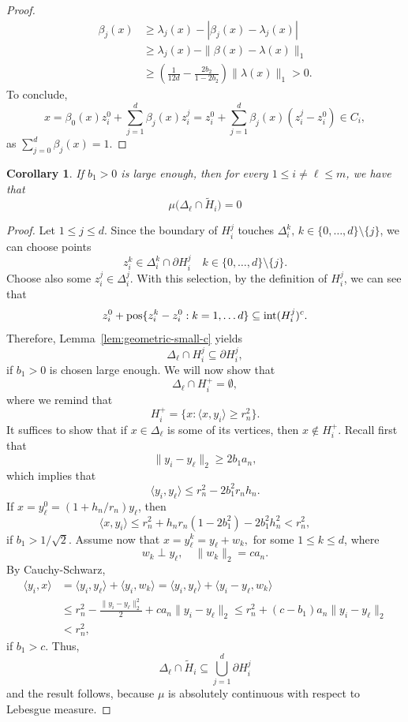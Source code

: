 \documentclass[10pt]{amsart}
\newcommand{\1}{\textbf{1}}
\newcommand{\pos}{{\rm pos}}
\numberwithin{equation}{section} %
\newtheorem{corollary}[theorem]{Corollary}
\theoremstyle{remark}
\theoremstyle{definition}
\begin{document}
\begin{proof}
\begin{align*}
    \beta_j(x)&\geq \lambda_j(x) -|\beta_j(x)-\lambda_j(x)| \\
    &\geq \lambda_j(x)-\|\beta(x)-\lambda(x)\|_1\\
    &\geq \left(\frac{1}{12d}-\frac{2b_2}{1-2b_2}\right)\| \lambda(x)\|_1>0.  
\end{align*}
To conclude, \[x=\beta_0(x)z_i^0+\sum_{j=1}^d \beta_j(x)z_i^j=z_i^0+\sum_{j=1}^d\beta_j(x)(z_i^j-z_i^0) \in C_i,\] as $\sum_{j=0}^d\beta_j(x)=1$.
\end{proof}

\begin{corollary}\label{cor:independence-under-condition}
    If $b_1>0$ is large enough, then for every $1 \leq i \neq \ell \leq m$, we have that \[\mu\bigl(\Delta_\ell \cap \widetilde{H}_i\bigr)=0\]
\end{corollary}

\begin{proof}
    Let $1 \leq j \leq d$. Since the boundary of $H_i^j$ touches $\Delta_i^k, \, k \in \{0,\ldots,d\} \setminus\{j\}$, we can choose points \[z_i^k \in \Delta_i^k \cap \partial H_i^j \quad k \in \{0,\ldots,d\}\setminus\{j\}.\] Choose also some $z_i^j \in \Delta_i^j$. With this selection, by the definition of $H_i^j$, we can see that \[z_i^0+\pos\{z_i^k-z_i^0:k=1,\ldots d\} \subseteq {\rm int}(H_i^j)^{c}.\] Therefore, Lemma~\ref{lem:geometric-small-c} yields \[\Delta_\ell \cap H_i^j \subseteq \partial H_i^j,\] if $b_1>0$ is chosen large enough. We will now show that \[\Delta_\ell \cap H_i^+=\emptyset,\] where we remind that \[H_i^+=\{x: \langle x,y_i \rangle \geq r_n^2\}.\] It suffices to show that if $x \in \Delta_\ell$ is some of its vertices, then $x \notin H_i^+$. Recall first that \[\|y_i-y_\ell\|_2 \geq 2b_1a_n,\] which implies that \[\langle y_i,y_\ell \rangle \leq r_n^2-2b_1^2r_nh_n. \] If $x=y_{\ell}^0=(1+h_n/r_n)y_\ell$, then \[\langle x,y_i\rangle \leq r_n^2+h_nr_n(1-2b_1^2)-2b_1^2h_n^2 <r_n^2,\] if $b_1>1/\sqrt{2}$. Assume now that $x=y_\ell^k=y_\ell+w_k,$ for some $1 \leq k \leq d$, where \[w_k \perp y_\ell, \quad \|w_k\|_2=ca_n.\] By Cauchy-Schwarz,
    \begin{align*}
        \langle y_i,x \rangle &=\langle y_i,y_\ell\rangle +\langle y_i,w_k\rangle=\langle y_i,y_\ell\rangle +\langle y_i -y_\ell,w_k\rangle\\
        & \leq r_n^2- \frac{\|y_i-y_\ell\|_2^2}{2}+ca_n \|y_i-y_\ell\|_2 \leq r_n^2+(c-b_1)a_n\|y_i-y_\ell\|_2\\
        &<r_n^2,
    \end{align*} if $b_1>c$. Thus, \[ \Delta_\ell \cap \widetilde{H}_i \subseteq \bigcup_{j=1}^{d} \partial H_i^j\] and the result follows, because $\mu$ is absolutely continuous with respect to Lebesgue measure.
\end{proof} 
\end{document}
